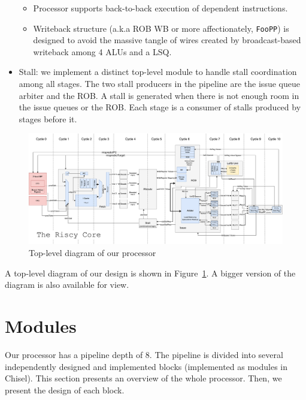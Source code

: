 \documentclass{article}
\begin{document}
\begin{itemize}
        \begin{itemize}
            \item Processor supports back-to-back execution of dependent
                instructions.
            \item Writeback structure (a.k.a ROB WB or more affectionately,
                \texttt{FooPP}) is designed to avoid the massive tangle of wires
                created by broadcast-based writeback among 4 ALUs and a LSQ.
        \end{itemize}
    \item Stall: we implement a distinct top-level module to handle stall
        coordination among all stages. The two stall producers in the pipeline
        are the issue queue arbiter and the ROB. A stall is generated when there
        is not enough room in the issue queues or the ROB. Each stage is a
        consumer of stalls produced by stages before it.
\end{itemize}

\begin{figure}[ht]
	\includegraphics[page=1,width=1.25\textwidth]{riscy_diagram.pdf}
	\caption{Top-level diagram of our processor}
	\label{fig:top-level}
\end{figure}

A top-level diagram of our design is shown in Figure~\ref{fig:top-level}. A
bigger version of the diagram is also available for view\cite{riscy-diagram}.

\section{Modules}
\label{sec:modules}

Our processor has a pipeline depth of 8. The pipeline is divided into several
independently designed and implemented blocks (implemented as modules in
Chisel). This section presents an overview of the whole processor. Then, we
present the design of each block.
\end{document}
